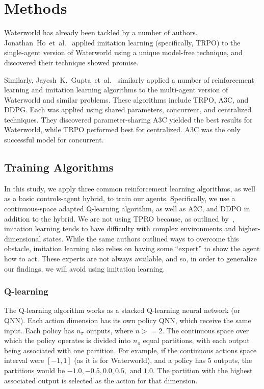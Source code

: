 \section{Methods}\label{sec:methods}
Waterworld has already been tackled by a number of authors.
Jonathan~Ho~et~al.~\cite{Ho2016} applied imitation learning (specifically, TRPO) to the
single-agent version of Waterworld using a unique model-free technique, and discovered
their technique showed promise.

Similarly, Jayesh~K.~Gupta~et~al.~\cite{Gupta2017} similarly applied a number of
reinforcement learning and imitation learning algorithms to the multi-agent version
of Waterworld and similar problems.
These algorithms include TRPO, A3C, and DDPG\@.
Each was applied using shared parameters, concurrent, and centralized techniques.
They discovered parameter-sharing A3C yielded the best results for Waterworld, while
TRPO performed best for centralized.
A3C was the only successful model for concurrent.

\subsection{Training Algorithms}\label{subsec:training-algorithms}
In this study, we apply three common reinforcement learning algorithms, as well as a
basic controls-agent hybrid, to train our agents.
Specifically, we use a continuous-space adapted Q-learning algorithm, as well as A2C,
and DDPO in addition to the hybrid.
We are not using TPRO because, as outlined by~\cite{Ho2016}, imitation learning tends
to have difficulty with complex environments and higher-dimensional states.
While the same authors outlined ways to overcome this obstacle, imitation learning
also relies on having some ``expert'' to show the agent how to act.
These experts are not always available, and so, in order to generalize our findings,
we will avoid using imitation learning.

\subsubsection{Q-learning}
The Q-learning algorithm works as a stacked Q-learning neural network (or QNN).
Each action dimension has its own policy QNN, which receive the same input.
Each policy has $n_\pi$ outputs, where $n >= 2$.
The continuous space over which the policy operates is divided into $n_\pi$ equal
partitions, with each output being associated with one partition.
For example, if the continuous actions space interval were $[-1, 1]$ (as it is for
Waterworld), and a policy has 5 outputs, the partitions would be $-1.0, -0.5, 0.0, 0.5,
\text{ and } 1.0$.
The partition with the highest associated output is selected as the action for that
dimension.